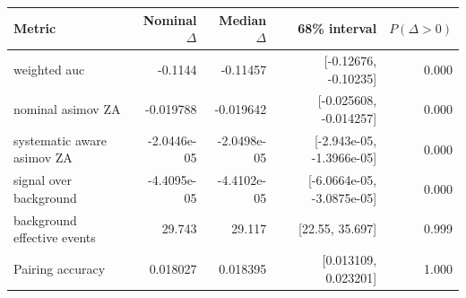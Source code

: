 \begin{tabular}{lrrrr}
\toprule
Metric & Nominal $\Delta$ & Median $\Delta$ & 68\% interval & $P(\Delta>0)$ \\
\midrule
weighted auc & -0.1144 & -0.11457 & [-0.12676, -0.10235] & 0.000 \\
nominal asimov ZA & -0.019788 & -0.019642 & [-0.025608, -0.014257] & 0.000 \\
systematic aware asimov ZA & -2.0446e-05 & -2.0498e-05 & [-2.943e-05, -1.3966e-05] & 0.000 \\
signal over background & -4.4095e-05 & -4.4102e-05 & [-6.0664e-05, -3.0875e-05] & 0.000 \\
background effective events & 29.743 & 29.117 & [22.55, 35.697] & 0.999 \\
Pairing accuracy & 0.018027 & 0.018395 & [0.013109, 0.023201] & 1.000 \\
\bottomrule
\end{tabular}
\par\medskip
